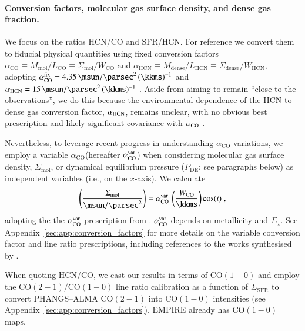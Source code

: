 \documentclass[letter, longauth]{aa} %
\newcommand*{\coone}{\ensuremath{\mathrm{CO(1-0)}}\xspace} %
\newcommand*{\cotwo}{\ensuremath{\mathrm{CO(2-1)}}\xspace} %
\newcommand*{\intCO}{\ensuremath{W_{\text{CO}}}\xspace}  %
\newcommand*{\intHCN}{\ensuremath{W_{\text{HCN}}}\xspace}  %
\newcommand*{\lco}{\ensuremath{L_{\text{CO}}}\xspace}  %
\newcommand*{\lhcn}{\ensuremath{L_{\text{HCN}}}\xspace}  %
\newcommand*{\sigmol}{\ensuremath{\Sigma_{\text{mol}}}\xspace}  %
\newcommand*{\pde}{\ensuremath{P_{\text{DE}}}\xspace}  %
\newcommand*{\alphaco}{\ensuremath{\alpha_{\text{CO}}}\xspace}  %
\newcommand*{\alphahcn}{\ensuremath{\alpha_{\text{HCN}}}\xspace}  %
\newcommand*{\sigsfr}{\ensuremath{\Sigma_{\text{SFR}}}\xspace}  %
\newcommand*{\mmol}{\ensuremath{M_{\text{mol}}}\xspace}  %
\newcommand*{\mdense}{\ensuremath{M_{\text{dense}}}\xspace}  %
\newcommand*{\sigdense}{\ensuremath{\Sigma_{\text{dense}}}\xspace}  %
\begin{document}
\paragraph{Conversion factors, molecular gas surface density, and dense gas fraction.} 
We focus on the ratios HCN/CO and SFR/HCN. 
For reference we convert them to fiducial physical quantities using fixed conversion factors $\alphaco\equiv\mmol/\lco\equiv\sigmol/\intCO$ and $\alphahcn\equiv\mdense/\lhcn\equiv\sigdense/\intHCN$, adopting $\alphaco^{\rm fix}=\SI{4.35}{\msun\per\square\parsec}\,(\SI{}{\kkms})^{-1}$ \citep{Bolatto2013} and $\alphahcn=\SI{15}{\msun\per\square\parsec}\,(\SI{}{\kkms})^{-1}$ \citep{Schinnerer2024}. 
Aside from aiming to remain ``close to the observations'', we do this because the environmental dependence of the HCN to dense gas conversion factor, $\alpha_{\rm HCN}$, remains unclear, with no obvious best prescription and likely significant covariance with $\alpha_{\rm CO}$ \citep[see][]{Usero2015}.

Nevertheless, to leverage recent progress in understanding \alphaco variations, we employ a variable \alphaco (hereafter $\alphaco^{\rm var}$) when considering molecular gas surface density, \sigmol, or dynamical equilibrium pressure (\pde; see paragraphs below) as independent variables (i.e., on the $x$-axis). We calculate
\begin{align}
\left(\dfrac{\sigmol}{\SI{}{\msun\per\square\parsec}}\right) = \alphaco^{\rm var}\,\left(\dfrac{\intCO}{\SI{}{\kkms}}\right) \cos(i) \;,
\end{align}
adopting the the $\alphaco^{\rm var}$ prescription from \citet{Schinnerer2024}. $\alphaco^{\rm var}$ depends on metallicity and $\Sigma_\star$. 
See Appendix~\ref{sec:app:conversion_factors} for more details on the variable conversion factor and line ratio prescriptions, including references to the works synthesised by \citet{Schinnerer2024}.


When quoting HCN/CO, we cast our results in terms of \coone and employ the $\cotwo/\coone$ line ratio calibration as a function of \sigsfr to convert PHANGS--ALMA \cotwo into \coone intensities (see Appendix~\ref{sec:app:conversion_factors}). 
EMPIRE already has \coone maps.
\end{document}
